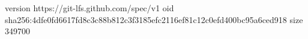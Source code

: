 version https://git-lfs.github.com/spec/v1
oid sha256:4dfe0fd6617fd8c3c88b812c3f3185efc2116ef81c12c0efd400bc95a6ced918
size 349700
